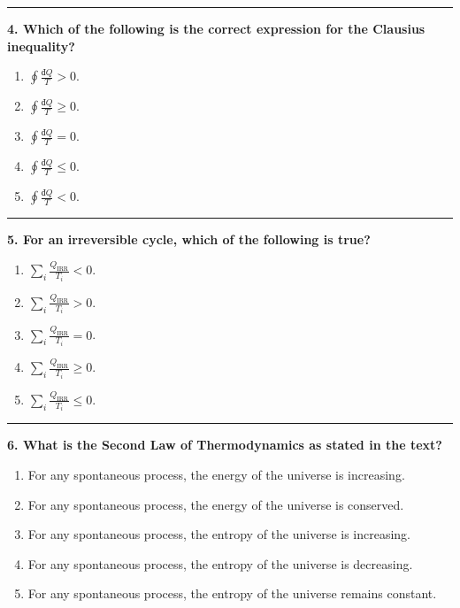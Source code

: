 \documentclass[
  9pt,
]{extbook}
\providecommand{\tightlist}{%
  \setlength{\itemsep}{0pt}\setlength{\parskip}{0pt}}
\theoremstyle{definition}
\theoremstyle{definition}
\theoremstyle{definition}
\theoremstyle{remark}
\begin{document}
\begin{center}\rule{0.5\linewidth}{0.5pt}\end{center}

\textbf{4. Which of the following is the correct expression for the Clausius inequality?}

\begin{enumerate}
\def\labelenumi{\alph{enumi}.}
\tightlist
\item
  \(\oint \frac{đQ}{T} > 0\).
\item
  \(\oint \frac{đQ}{T} \geq 0\).
\item
  \(\oint \frac{đQ}{T} = 0\).
\item
  \(\oint \frac{đQ}{T} \leq 0\).
\item
  \(\oint \frac{đQ}{T} < 0\).
\end{enumerate}

\begin{center}\rule{0.5\linewidth}{0.5pt}\end{center}

\textbf{5. For an irreversible cycle, which of the following is true?}

\begin{enumerate}
\def\labelenumi{\alph{enumi}.}
\tightlist
\item
  \(\sum_i \frac{Q_{\text{IRR}}}{T_i} < 0\).
\item
  \(\sum_i \frac{Q_{\text{IRR}}}{T_i} > 0\).
\item
  \(\sum_i \frac{Q_{\text{IRR}}}{T_i} = 0\).
\item
  \(\sum_i \frac{Q_{\text{IRR}}}{T_i} \geq 0\).
\item
  \(\sum_i \frac{Q_{\text{IRR}}}{T_i} \leq 0\).
\end{enumerate}

\begin{center}\rule{0.5\linewidth}{0.5pt}\end{center}

\textbf{6. What is the Second Law of Thermodynamics as stated in the text?}

\begin{enumerate}
\def\labelenumi{\alph{enumi}.}
\tightlist
\item
  For any spontaneous process, the energy of the universe is increasing.
\item
  For any spontaneous process, the energy of the universe is conserved.
\item
  For any spontaneous process, the entropy of the universe is increasing.
\item
  For any spontaneous process, the entropy of the universe is decreasing.
\item
  For any spontaneous process, the entropy of the universe remains constant.
\end{enumerate}
\end{document}
